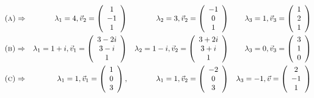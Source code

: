 \documentclass[11pt,answers]{exam}
\begin{document}
\begin{questions}
\begin{solution}
\begin{align*}
&\hbox{\textsc{(a)}} \Rightarrow &\lambda_1 = 4, \vec{v}_2 = \left(\begin{array}{c}1\\-1\\1\end{array}\right) & &\lambda_2 = 3, \vec{v}_2 = \left(\begin{array}{c}-1\\0\\1\end{array}\right) & &\lambda_3 = 1, \vec{v}_3 = \left(\begin{array}{c}1\\2\\1\end{array}\right) \\
&\hbox{\textsc{(b)}} \Rightarrow &\lambda_1 = 1 + i, \vec{v}_1 = \left(\begin{array}{c} 3 - 2i \\ 3 - i \\ 1 \end{array}\right) & &\lambda_2 = 1 - i, \vec{v}_2 = \left(\begin{array}{c} 3 + 2i \\ 3 + i \\ 1 \end{array}\right) & &\lambda_3 = 0, \vec{v}_3 = \left(\begin{array}{c} 3 \\ 1 \\ 0 \end{array}\right) \\
&\hbox{\textsc{(c)}} \Rightarrow &\lambda_{1} = 1, \vec{v}_1 = \left(\begin{array}{c} 1 \\ 0 \\ 3 \end{array}\right), & &\lambda_{1} = 1, \vec{v}_2 = \left(\begin{array}{c} -2 \\ 0 \\ 3 \end{array}\right) & &\lambda_3 = -1, \vec{v} = \left(\begin{array}{c} 2 \\ -1 \\ 1 \end{array}\right)
\end{align*}
\[
\]
\end{solution}
\end{questions}
\end{document}
